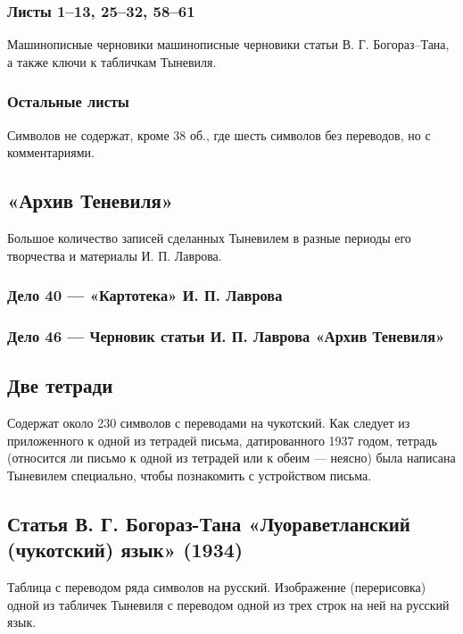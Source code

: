 \documentclass{article}
\begin{document}
\subsubsection{Листы 1–13, 25–32, 58–61}
Машинописные черновики машинописные черновики статьи В. Г. Богораз–Тана, а также ключи к табличкам Тыневиля.

\subsubsection{Остальные листы}

Символов не содержат, кроме 38 об., где шесть символов без переводов, но с комментариями.

\subsection{«Архив Теневиля»}

Большое количество записей сделанных Тыневилем в разные периоды его творчества и материалы И. П. Лаврова.

\subsubsection{Дело 40 — «Картотека» И. П. Лаврова}

\subsubsection{Дело 46 — Черновик статьи И. П. Лаврова «Архив Теневиля» }

\subsection{Две тетради}

Содержат около 230 символов с переводами на чукотский. Как следует из приложенного к одной из тетрадей письма, датированного 1937 годом, тетрадь (относится ли письмо к одной из тетрадей или к обеим — неясно) была написана Тыневилем специально, чтобы познакомить с устройством письма. 

\subsection{Статья В. Г. Богораз-Тана «Луораветланский (чукотский) язык» (1934)}

Таблица с переводом ряда символов на русский. Изображение (перерисовка) одной из табличек Тыневиля с переводом одной из трех строк на ней на русский язык.
\end{document}
